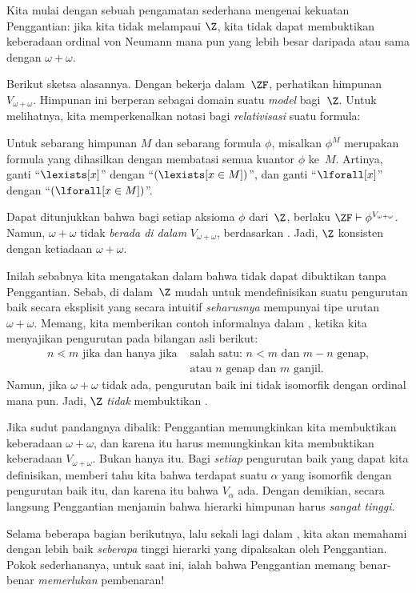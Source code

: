 \documentclass[../../../include/open-logic-section]{subfiles}
\begin{document}

Kita mulai dengan sebuah pengamatan sederhana mengenai kekuatan Penggantian:
jika kita tidak melampaui $\Z$, kita tidak dapat membuktikan keberadaan
ordinal von Neumann mana pun yang lebih besar daripada atau sama dengan
$\omega + \omega$.

Berikut sketsa alasannya. Dengan bekerja dalam~$\ZF$, perhatikan himpunan
$V_{\omega+\omega}$. Himpunan ini berperan sebagai domain suatu \emph{model}
bagi~$\Z$. Untuk melihatnya, kita memperkenalkan notasi bagi
\emph{relativisasi} suatu formula:
\begin{defn}
	Untuk sebarang himpunan $M$ dan sebarang formula $\phi$, misalkan $\phi^M$
	merupakan formula yang dihasilkan dengan membatasi semua kuantor $\phi$
	ke~$M$. Artinya, ganti ``$\lexists[x]$'' dengan
	``$(\lexists[x \in M])$'', dan ganti ``$\lforall[x]$'' dengan
	``$(\lforall[x \in M])$''.
\end{defn}\noindent
Dapat ditunjukkan bahwa bagi setiap aksioma $\phi$ dari~$\Z$, berlaku
$\ZF \vdash \phi^{V_{\omega+\omega}}$. Namun, $\omega+\omega$ tidak
\emph{berada di dalam} $V_{\omega+\omega}$, berdasarkan
. Jadi, $\Z$ konsisten dengan
ketiadaan $\omega+\omega$.

Inilah sebabnya kita mengatakan dalam 
bahwa  tidak dapat
dibuktikan tanpa Penggantian. Sebab, di dalam~$\Z$ mudah untuk mendefinisikan
suatu pengurutan baik secara eksplisit yang secara intuitif
\emph{seharusnya} mempunyai tipe urutan $\omega+\omega$. Memang, kita
memberikan contoh informalnya dalam , ketika kita
menyajikan pengurutan pada bilangan asli berikut:
\begin{align*}
	n \lessdot m \text{ jika dan hanya jika }&\text{salah satu: }n < m\text{ dan }m-n\text{ genap,}\\
	& \text{atau $n$ genap dan $m$ ganjil.}
\end{align*}
Namun, jika $\omega+\omega$ tidak ada, pengurutan baik ini tidak isomorfik
dengan ordinal mana pun. Jadi, $\Z$ \emph{tidak} membuktikan
.

Jika sudut pandangnya dibalik: Penggantian memungkinkan kita membuktikan
keberadaan $\omega+\omega$, dan karena itu harus memungkinkan kita
membuktikan keberadaan $V_{\omega+\omega}$. Bukan hanya itu. Bagi
\emph{setiap} pengurutan baik yang dapat kita definisikan,
 memberi tahu kita bahwa
terdapat suatu $\alpha$ yang isomorfik dengan pengurutan baik itu, dan karena
itu bahwa $V_\alpha$ ada. Dengan demikian, secara langsung Penggantian
menjamin bahwa hierarki himpunan harus \emph{sangat tinggi}.

Selama beberapa bagian berikutnya, lalu sekali lagi dalam
, kita akan memahami dengan lebih baik
\emph{seberapa} tinggi hierarki yang dipaksakan oleh Penggantian. Pokok
sederhananya, untuk saat ini, ialah bahwa Penggantian memang benar-benar
\emph{memerlukan} pembenaran!
\end{document}
